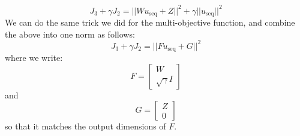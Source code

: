 \documentclass[12pt]{exam}
\begin{document}
\begin{questions}
\begin{solution}
\begin{enumerate}[label=(\alph*)]
      \[
        J_3 + \gamma J_2 = ||W u_{\text{seq}} + Z||^2 + \gamma||u_{\text{seq}}||^2
      \]
      We can do the same trick we did for the multi-objective function, and combine the above into one norm as follows:
      \[
        J_3 + \gamma J_2 = ||F u_{\text{seq}} + G ||^2 
      \]
      where we write:
      \[
        F = \begin{bmatrix}
          W \\
          \sqrt{\gamma}I
        \end{bmatrix}
      \]
      and 
      \[
        G = 
          \begin{bmatrix}
            Z \\
            0
          \end{bmatrix}
      \]
      so that it matches the output dimensions of $F$.


\end{enumerate}
\end{solution}
\end{questions}
\end{document}

